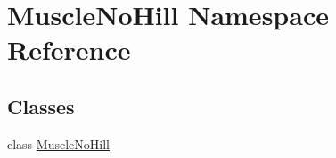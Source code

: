\hypertarget{namespace_muscle_no_hill}{}\section{Muscle\+No\+Hill Namespace Reference}
\label{namespace_muscle_no_hill}
\subsection*{Classes}
\begin{DoxyCompactItemize}
\item 
class \hyperlink{class_muscle_no_hill_1_1_muscle_no_hill}{Muscle\+No\+Hill}
\end{DoxyCompactItemize}
